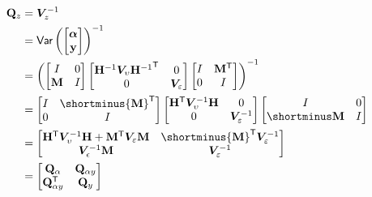 \documentclass[notitlepage,a4paper,12pt]{article}
\newcommand{\transpose}[1]{{#1}^{\sf{T}}}
\begin{document}
\begin{align*}
    \mathbf{Q}_z 
    &= 
    \bm{V}^{-1}_z \\
    &= 
    \text{\sf{Var}}\left(
    \begin{bmatrix}
        \boldsymbol{\alpha} \\
        \mathbf{y}
    \end{bmatrix}
    \right)^{-1} \\
    &=  
    \left(
    \begin{bmatrix}
        I & 0 \\
        \mathbf{M} & I
    \end{bmatrix}
    \begin{bmatrix}
        \mathbf{H}^{-1} \bm{V}_{\upsilon} \transpose{\mathbf{H}^{-1}} & 0 \\
        0 & \bm{V}_{\varepsilon}
    \end{bmatrix} 
    \begin{bmatrix}
        I & \transpose{\mathbf{M}} \\
        0 & I
    \end{bmatrix}
    \right)^{-1}\\
    &=
    \begin{bmatrix}
        I & \shortminus\transpose{\mathbf{M}} \\
        0 & I
    \end{bmatrix}
    \begin{bmatrix}
        \transpose{\mathbf{H}} \bm{V}^{-1}_{\upsilon} \mathbf{H} & 0 \\
        0 & \bm{V}^{-1}_{\varepsilon}
    \end{bmatrix} 
    \begin{bmatrix}
        I & 0 \\
        \shortminus\mathbf{M} & I 
    \end{bmatrix} \\
    &=
    \begin{bmatrix}
         \transpose{\mathbf{H}} \bm{V}^{-1}_{\upsilon} \mathbf{H} + \transpose{\mathbf{M}}\bm{V}_{\varepsilon}\mathbf{M}  & \shortminus \transpose{\mathbf{M}} \bm{V}^{-1}_{\varepsilon} \\
         \bm{V}^{-1}_{\epsilon} \mathbf{M} & \bm{V}^{-1}_{\varepsilon}
    \end{bmatrix} \\
    &= 
    \begin{bmatrix}
        \mathbf{Q}_{\alpha} & \mathbf{Q}_{\alpha y} \\
        \transpose{\mathbf{Q}}_{\alpha y} & \mathbf{Q}_{y}  
    \end{bmatrix}
\end{align*}
\end{document}
